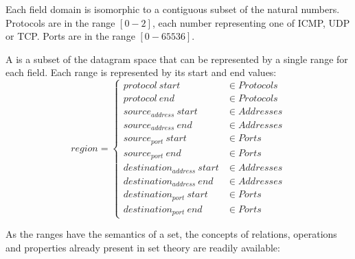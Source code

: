 Each field domain is isomorphic to a contiguous subset of the natural numbers.
Protocols are in the range $[0-2]$, each number representing one of ICMP, UDP or
TCP. Ports are in the range $[0-65536]$.

A  is a subset of the datagram space that can be represented by a
single range for each field. Each range is represented by its start and end
values:
\begin{equation*}
	region =
	\begin{cases}
		protocol~start & \in Protocols \\
		protocol~end & \in Protocols \\
		source_{address}~start & \in Addresses \\
		source_{address}~end & \in Addresses \\
		source_{port}~start & \in Ports \\
		source_{port}~end & \in Ports \\
		destination_{address}~start & \in Addresses \\
		destination_{address}~end & \in Addresses \\
		destination_{port}~start & \in Ports \\
		destination_{port}~end & \in Ports
	\end{cases}
\end{equation*}

As the ranges have the semantics of a set, the concepts of relations, operations
and properties already present in set theory \cite{devlin:jos} are readily available:


